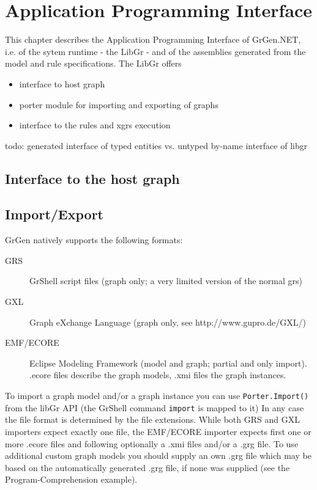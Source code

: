 \chapter{Application Programming Interface}
\label{chapapi}

This chapter describes the Application Programming Interface of GrGen.NET, i.e. of the sytem runtime - the LibGr - and of the assemblies generated from the model and rule specifications.
The LibGr offers
\begin{itemize}
\item interface to host graph
\item porter module for importing and exporting of graphs
\item interface to the rules and xgrs execution
\end{itemize}

todo: generated interface of typed entities vs. untyped by-name interface of libgr

\section{Interface to the host graph}

\section{Import/Export}\label{sub:imexport}

GrGen natively supports the following formats:
\begin{description}
  \item[GRS] GrShell script files (graph only; a very limited version of the normal grs)
  \item[GXL] Graph eXchange Language (graph only, see http://www.gupro.de/GXL/)
  \item[EMF/ECORE] Eclipse Modeling Framework (model and graph; partial and only import).
      .ecore files describe the graph models, .xmi files the graph instances.
\end{description}

To import a graph model and/or a graph instance you can use
\verb#Porter.Import()# from the libGr API (the GrShell command \verb#import# is mapped to it)
In any case the file format is determined by the file extensions.
While both GRS and GXL importers expect exactly one file, the EMF/ECORE importer
expects first one or more .ecore files and following optionally a .xmi files and/or
a .grg file. To use additional custom graph models you should supply an own .grg
file which may be based on the automatically generated .grg file, if none was
supplied (see the Program-Comprehension example).

